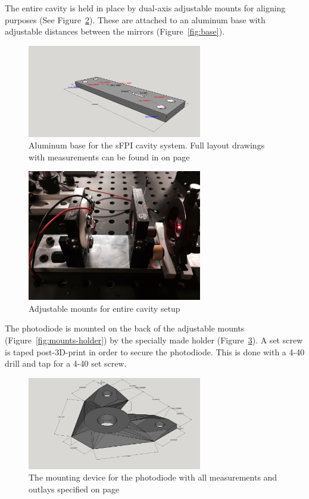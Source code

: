 \documentclass[12pt,journal]{IEEEtran}
\begin{document}
The entire cavity is held in place by dual-axis adjustable mounts for aligning purposes (See Figure~\ref{fig:full-cavity}). These are attached to an aluminum base with adjustable distances between the mirrors (Figure~\ref{fig:base}).

\begin{figure}[h!]
  \centering
	\includegraphics[width=3in]{./mechanical/sfpilensholder_3d_rep.png}
	\caption[Cavity Mounts]{Aluminum base for the sFPI cavity system. Full layout drawings with measurements can be found in on page~\pageref{ss:sfpilensholder}}
	\label{fig:full-cavity}
\end{figure}

\begin{figure}[h!]
  \centering
	\includegraphics[width=3in]{full-cavity.png}
	\caption[Cavity Mounts]{Adjustable mounts for entire cavity setup}
	\label{fig:full-cavity}
\end{figure}

The photodiode is mounted on the back of the adjustable mounts (Figure~\ref{fig:mounts-holder}) by the specially made holder (Figure~\ref{fig:diode_holder}). A set screw is taped post-3D-print in order to secure the photodiode. This is done with a 4-40 drill and tap for a 4-40 set screw. 

\begin{figure}[h!]
  \centering
	\includegraphics[width=3in]{./mechanical/diode_holder_3d_rep.png}
	\caption[Cavity Mounts]{The mounting device for the photodiode with all measurements and outlays specified on page~\pageref{ss:diode_holder}}
	\label{fig:diode_holder}
\end{figure}
\end{document}

